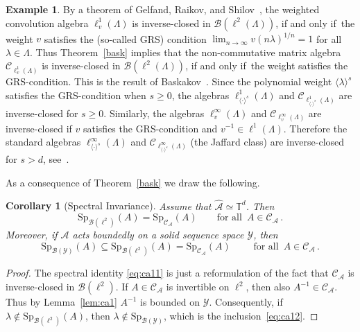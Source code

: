 \documentclass[12pt]{amsart}
\newtheorem{corollary}{Corollary}[section]
\theoremstyle{definition}
\newtheorem{example}{Example}[section]
\theoremstyle{remark}
\numberwithin{equation}{section}
\def\cB{\mathcal{B}}
\def\cA{\mathcal{A}}
\def\cC{\mathcal{C}}
\def\cY{\mathcal{Y}}
\def\bT{{\mathbb{T}}}
\def\cca{\Cal C_\ac}
\def\inv{^{-1}}
\def\cB{\mathcal{B}}
\def\cA{\mathcal{A}}
\def\cC{\mathcal{C}}
\newcommand{\fif}{if and only if}
\newcommand{\Cal}{\mathcal}
\newcommand{\la}{\lambda}
\newcommand{\La}{\Lambda}
\newcommand{\lan}{\langle}
\newcommand{\ran}{\rangle}
\newcommand{\ac}{\Cal A}
\begin{document}
\begin{example}\label{example2} By a theorem of Gelfand, Raikov, and
Shilov~\cite{gelfandraikov}, the weighted  convolution algebra $\ell ^1_v (\La
)$ is inverse-closed in $\cB (\ell ^2(\La))$, \fif\ the weight $v$
satisfies the (so-called GRS) condition $\lim _{n\to \infty }
v(n\lambda )^{1/n} =1$ for all $\lambda \in \Lambda $. Thus
Theorem~\ref{bask} implies that the non-commutative matrix algebra
$\cC _{\ell ^1_v(\La)}$ is inverse-closed in $\cB (\ell ^2(\La))$,
\fif\ the weight satisfies the GRS-condition. This is the result of
Baskakov~\cite{Bas90}. Since the polynomial  weight
$\lan\la\ran^s$ satisfies the GRS-condition when $s\ge 0$, the
algebras $\ell^1_{\lan\cdot\ran^s}(\La)$ and
$\cC_{\ell^1_{\lan\cdot\ran^s}(\La)}$ are inverse-closed for $s\ge
0$.
Similarly,  the algebras $\ell^\infty_{v}(\La)$ and
$\cC_{\ell^\infty_{v}(\La)}$ are inverse-closed if $v$ satisfies
the GRS-condition and $v^{-1}\in \ell^1(\La)$. Therefore the
standard algebras $\ell^\infty_{\lan\cdot\ran^s}(\La)$ and
$\cC_{\ell^\infty_{\lan\cdot\ran^s}(\La)}$ (the Jaffard class) are
inverse-closed for $s>d$, see~\cite{jaffard90,Bas90,GL04}.
\end{example}

As a consequence of Theorem~\ref{bask} we draw the following.


\begin{corollary}[Spectral Invariance]\label{specin}
Assume that $\widehat{\cA } \simeq \bT ^d$. Then
\begin{equation}\label{eq:ca11}
 \mathrm{Sp}_{\cB (\ell ^2)} (A) = \mathrm{Sp}_{\cca } (A) \qquad \text{
for all } \, A \in \cca \, .
\end{equation}
Moreover, if $\cA $ acts boundedly  on a solid sequence space
$\cY$,
then
\begin{equation}\label{eq:ca12}
\mathrm{Sp} _{\cB (\cY )} (A) \subseteq \mathrm{Sp}_{\cB (\ell ^2)} (A) =
\mathrm{Sp}_{\cca } (A) \qquad \text{ for all } \, A \in \cca \, .
\end{equation}
\end{corollary}

\begin{proof}
The spectral identity \eqref{eq:ca11} is just a reformulation of the
fact that $\cC _{\cA } $ is inverse-closed in $\cB (\ell ^2)$. If
$A\in \cC _{\cA }$ is invertible on $\ell ^2$, then also $A\inv \in
\cC _{\cA }$. Thus by Lemma~\ref{lem:ca1} $A\inv $ is bounded on
$\cY$. Consequently, if $\lambda \not  \in \mathrm{Sp}_{\cB (\ell
  ^2)}(A)$, then $\lambda \not  \in \mathrm{Sp}_{\cB (\cY )}$, which
is the inclusion~\eqref{eq:ca12}.
\end{proof}
\end{document}
